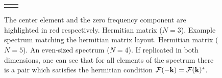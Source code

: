 \begin{figure}
\begin{tabular}{cc}
 \subtop[]{
	$\left(\begin{array}{lllll}
	a   & b   & c             & d   & e   \\
	f   & g   & h             & i   & j   \\
	k   & l   & \color{red} m & l^* & k^* \\
	j^* & i^* & h^*           & g^* & f^* \\
	e^* & d^* & c^*           & b^* & a^* \\
	\end{array}\right)$
	\label{fig:symmetry:even:layout}
 }
 &
 \subtop[]{
	$\left(\begin{array}{llll|l}
	 \num{3.5886 + 0.0i}     & \num{0.5354 - 0.9111i}  & \num{-8.3447 + 0.0i}   & \num{0.5354 + 0.9111i}  & \num{3.5886 + 0.0i} \\
	 \num{-2.0288 - 1.4957i} & \num{-0.2199 - 0.7443i} & \num{2.7433 + 2.5938i} & \num{0.1182 + 0.3465i}  & \num{-2.0288 - 1.4957i} \\
	 \num{-0.5139 + 0.0i}    & \num{0.5448 - 0.2298i}  & \color{red}\num{0}     & \num{0.5448 + 0.2298i}  & \num{-0.5139 + 0.0i} \\
	 \num{-2.0288 + 1.4957i} & \num{0.1182 - 0.3465i}  & \num{2.7433 - 2.5938i} & \num{-0.2199 + 0.7443i} & \num{-2.0288 + 1.4957i} \\
	 \hline
	 \num{3.5886 + 0.0i}     & \num{0.5354 - 0.9111i}  & \num{-8.3447 + 0.0i}   & \num{0.5354 + 0.9111i}  & \num{3.5886 + 0.0i} \\
	\end{array}\right)$
	\label{fig:symmetry:even:example}
 }
\end{tabular}
\caption{
The center element and the zero frequency component are highlighted in red respectively.
 Hermitian matrix ($N=3$).
 Example spectrum matching the hermitian matrix layout.
 Hermitian matrix ($N=5$).
 An even-sized spectrum ($N=4$). If replicated in both dimensions,
one can see that for all elements of the spectrum there is a pair which satisfies the hermitian
condition $\mathcal{F}(-\mathbf{k})=\mathcal{F}(\mathbf{k})^*$.
}
\label{fig:symmetry}
\end{figure}
